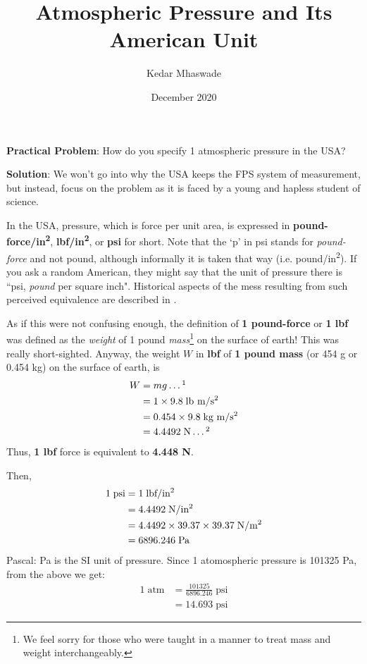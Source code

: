 \documentclass[a6paper]{article}
\begin{document}
\title{Atmospheric Pressure and Its American Unit}
\author{Kedar Mhaswade}
\date{December 2020}
\maketitle
\textbf{Practical Problem}: 
How do you specify 1 atmospheric pressure in the USA?

\textbf{Solution}:
We won't go into why the USA keeps the FPS system of measurement, but instead, focus on the problem as it is faced by a young and hapless student of science.

In the USA, pressure, which is force per unit area, is expressed in \textbf{pound-force/in\textsuperscript{2}}, \textbf{lbf/in\textsuperscript{2}}, or \textbf{psi} for short. Note that the `p' in psi stands for \emph{pound-force} and not pound, although informally it is taken that way (i.e. pound/in\textsuperscript{2}). If you ask a random American, they might say that the unit of pressure there is ``psi, \emph{pound} per square inch". Historical aspects of the mess resulting from such perceived equivalence are described in \cite{esu}.

As if this were not confusing enough, the definition of \textbf{1 pound-force} or \textbf{1 lbf} was defined as the \emph{weight} of 1 pound \emph{mass}\footnote{We feel sorry for those who were taught in a manner to treat mass and weight interchangeably.} on the surface of earth! This was really short-sighted. Anyway, the weight $W$ in \textbf{lbf} of \textbf{1 pound mass} (or 454 \si{\gram} or 0.454 \si{\kg}) on the surface of earth, is 
\begin{align*}
    W 
    &= mg \dots \footnotemark\\
    &= 1\times 9.8 \; \text{lb m/s\textsuperscript{2}} \\
    &= 0.454\times 9.8\; \text{kg m/s\textsuperscript{2}}\\
    &= 4.4492\; \text{N} \dots \footnotemark
\end{align*}
Thus, \textbf{1 lbf} force is equivalent to \textbf{4.448 \si{\newton}}.

Then, 
\begin{align*}
    1 \; \text{psi} 
    &= 1 \; \text{lbf/in\textsuperscript{2}} \\
    &= 4.4492 \; \text{N/in\textsuperscript{2}} \\
    &= 4.4492 \times 39.37 \times 39.37\; \text{N/m\textsuperscript{2}} \\
    &= 6896.246 \; \si{\pascal}
\end{align*}
Pascal: \si{\pascal} is the SI unit of pressure. Since 1 atomospheric pressure is 101325 \si{\pascal}, from the above we get:
\begin{align*}
    1 \; \text{atm} 
    &= \frac{101325}{6896.246} \;\text{psi} \\
    &= 14.693 \; \text{psi}
\end{align*}
\end{document}
